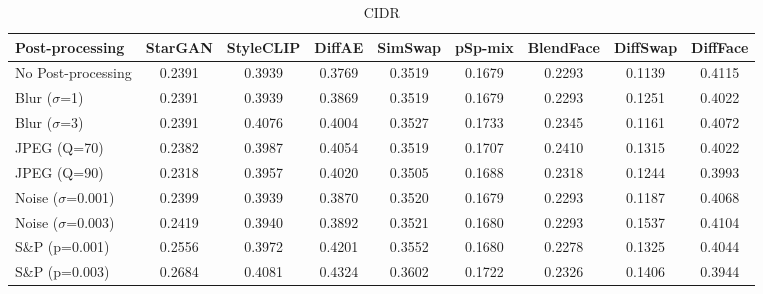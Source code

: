 \documentclass{article}
\begin{document}
\begin{table}[h!]
\begin{subtable}{\textwidth}
\caption{CIDR}
\centering
\scriptsize
\begin{tabular}{lcccccccc}
\toprule
\textbf{Post-processing} & StarGAN & StyleCLIP & DiffAE & SimSwap & pSp-mix & BlendFace & DiffSwap & DiffFace \\
\midrule
No Post-processing & 0.2391 & 0.3939 & 0.3769 & 0.3519 & 0.1679 & 0.2293 & 0.1139 & 0.4115 \\
\midrule
Blur ($\sigma$=1) & 0.2391 & 0.3939 & 0.3869 & 0.3519 & 0.1679 & 0.2293 & 0.1251 & 0.4022 \\
Blur ($\sigma$=3) & 0.2391 & 0.4076 & 0.4004 & 0.3527 & 0.1733 & 0.2345 & 0.1161 & 0.4072 \\
JPEG (Q=70) & 0.2382 & 0.3987 & 0.4054 & 0.3519 & 0.1707 & 0.2410 & 0.1315 & 0.4022 \\
JPEG (Q=90) & 0.2318 & 0.3957 & 0.4020 & 0.3505 & 0.1688 & 0.2318 & 0.1244 & 0.3993 \\
Noise ($\sigma$=0.001) & 0.2399 & 0.3939 & 0.3870 & 0.3520 & 0.1679 & 0.2293 & 0.1187 & 0.4068 \\
Noise ($\sigma$=0.003) & 0.2419 & 0.3940 & 0.3892 & 0.3521 & 0.1680 & 0.2293 & 0.1537 & 0.4104 \\
S\&P (p=0.001) & 0.2556 & 0.3972 & 0.4201 & 0.3552 & 0.1680 & 0.2278 & 0.1325 & 0.4044 \\
S\&P (p=0.003) & 0.2684 & 0.4081 & 0.4324 & 0.3602 & 0.1722 & 0.2326 & 0.1406 & 0.3944 \\
\bottomrule
\end{tabular}
\end{subtable}


\end{table}
\end{document}

